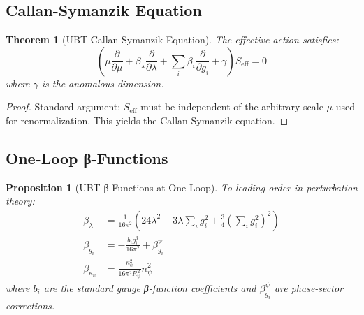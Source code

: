 \documentclass[12pt]{article}
\newtheorem{theorem}[definition]{Theorem}
\newtheorem{proposition}[definition]{Proposition}
\begin{document}
\subsection{Callan-Symanzik Equation}

\begin{theorem}[UBT Callan-Symanzik Equation]
The effective action satisfies:
\begin{equation}
\left( \mu \frac{\partial}{\partial \mu} + \beta_\lambda \frac{\partial}{\partial \lambda} + \sum_i \beta_i \frac{\partial}{\partial g_i} + \gamma \right) S_{\text{eff}} = 0
\label{eq:callan_symanzik}
\end{equation}
where $\gamma$ is the anomalous dimension.
\end{theorem}

\begin{proof}
Standard argument: $S_{\text{eff}}$ must be independent of the arbitrary scale $\mu$ used for renormalization. This yields the Callan-Symanzik equation.
\end{proof}

\subsection{One-Loop β-Functions}

\begin{proposition}[UBT β-Functions at One Loop]
To leading order in perturbation theory:
\begin{align}
\beta_\lambda &= \frac{1}{16\pi^2} \left( 24 \lambda^2 - 3 \lambda \sum_i g_i^2 + \frac{3}{4} \left(\sum_i g_i^2\right)^2 \right) \label{eq:beta_lambda} \\
\beta_{g_i} &= -\frac{b_i g_i^3}{16\pi^2} + \beta_{g_i}^{\psi} \label{eq:beta_gauge} \\
\beta_{\kappa_\psi} &= \frac{\kappa_\psi^2}{16\pi^2 R_\psi^2} n_\psi^2 \label{eq:beta_kappa}
\end{align}
where $b_i$ are the standard gauge β-function coefficients and $\beta_{g_i}^{\psi}$ are phase-sector corrections.
\end{proposition}
\end{document}
